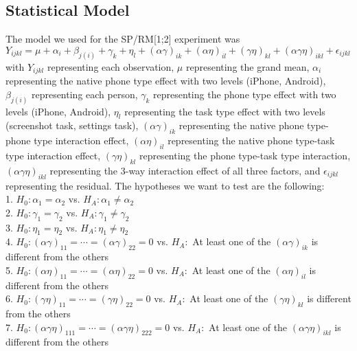 \documentclass[conference]{IEEEtran}
\begin{document}
\subsection{Statistical Model}
The model we used for the SP/RM[1;2] experiment was $Y_{ijkl} = \mu + \alpha_{i} + \beta_{j(i)} + \gamma_{k} + \eta_{l} + (\alpha\gamma)_{ik} + (\alpha\eta)_{il} + (\gamma\eta)_{kl} + (\alpha\gamma\eta)_{ikl} + \epsilon_{ijkl}$ with $Y_{ijkl}$ representing each observation, $\mu$ representing the grand mean, $\alpha_{i}$ representing the native phone type effect with two levels (iPhone, Android), $\beta_{j(i)}$ representing each person, $\gamma_{k}$ representing the phone type effect with two levels (iPhone, Android), $\eta_{l}$ representing  the task type effect with two levels (screenshot task, settings task), $(\alpha\gamma)_{ik}$ representing the native phone type-phone type interaction effect, $(\alpha\eta)_{il}$ representing the native phone type-task type interaction effect, $(\gamma\eta)_{kl}$ representing the phone type-task type interaction, $(\alpha\gamma\eta)_{ikl}$ representing the 3-way interaction effect of all three factors, and $\epsilon_{ijkl}$ representing the residual.
The hypotheses we want to test are the following: \\
1. $H_0: \alpha_1 = \alpha_2$ vs. $H_A: \alpha_1 \neq \alpha_2$ \\
2. $H_0: \gamma_1 = \gamma_2$ vs. $H_A: \gamma_1 \neq \gamma_2$\\
3. $H_0: \eta_1 = \eta_2$ vs. $H_A: \eta_1 \neq \eta_2$\\
4. $H_0: (\alpha\gamma)_{11} = \cdots = (\alpha\gamma)_{22} = 0$ vs. $H_A:$ At least one of the $(\alpha\gamma)_{ik}$ is different from the others \\
5. $H_0: (\alpha\eta)_{11} = \cdots = (\alpha\eta)_{22} = 0$ vs. $H_A:$ At least one of the $(\alpha\eta)_{il}$ is different from the others \\
6. $H_0: (\gamma\eta)_{11} = \cdots = (\gamma\eta)_{22} = 0$ vs. $H_A:$ At least one of the $(\gamma\eta)_{kl}$ is different from the others \\
7. $H_0: (\alpha\gamma\eta)_{111} = \cdots = (\alpha\gamma\eta)_{222} = 0$ vs. $H_A:$ At least one of the $(\alpha\gamma\eta)_{ikl}$ is different from the others \\
\end{document}
